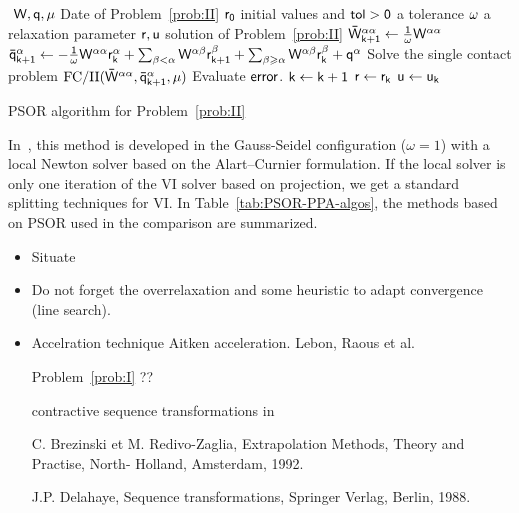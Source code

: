\begin{algorithm}
  \begin{algorithmic}
    {\sf
      \STATE $ $ 
      \REQUIRE $\sf W,q,\mu $ Date of Problem~\ref{prob:II} 
      \REQUIRE $\sf r_0$ initial values and $\sf tol >0$ a tolerance
      \REQUIRE $\sf \omega$ a relaxation parameter 
      \ENSURE  $\sf r,u$ solution of Problem~\ref{prob:II}
      \STATE $\sf \bar W^{\alpha\alpha}_{k+1} \leftarrow  \frac 1 \omega W^{\alpha\alpha}$
      \STATE $\sf   \bar q^{\alpha}_{k+1} \leftarrow - \frac 1 \omega W^{\alpha\alpha} r^{\alpha}_{k}
      + \sum_{\beta < \alpha}W^{\alpha\beta} r^{\beta}_{k+1} + \sum_{\beta
        \geq \alpha}W^{\alpha\beta} r^{\beta}_{k} + q^\alpha $
      \STATE Solve the single contact problem $\sf \mathrm{FC/II}(\bar W^{\alpha\alpha},\bar q^{\alpha}_{k+1},\mu)$
      \ENDFOR
      \STATE Evaluate $\sf error$.
      \STATE $\sf k \leftarrow k+1$ 
      \ENDWHILE
      \STATE $\sf r \leftarrow r_{k}$ 
      \STATE $\sf u \leftarrow u_{k}$ 
    }
  \end{algorithmic}
  \caption{PSOR algorithm for Problem~\ref{prob:II}}  \label{Algo:PSOR-II}
\end{algorithm}

In~\cite{Jourdan.Alart.ea98}, this method is developed in the Gauss-Seidel configuration ($\omega=1$) with a local Newton solver based on the Alart--Curnier formulation. If the local solver is only one iteration of the VI solver based on projection, we get a standard splitting techniques for VI. In Table~\ref{tab:PSOR-PPA-algos}, the methods based on PSOR used in the comparison are summarized.

\begin{ndrva}
  \begin{itemize}
  \item Situate \cite{Hayashi.ea_JCAM2005}
  \item Do not forget the overrelaxation and some heuristic to adapt convergence (line search).
  \item Accelration technique
    Aitken acceleration. Lebon, Raous et al.
    
    Problem~\ref{prob:I} ??
    
    contractive sequence transformations in 
    
    C. Brezinski et M. Redivo-Zaglia, Extrapolation Methods, Theory and Practise, North- Holland, Amsterdam, 1992.
    
    J.P. Delahaye, Sequence transformations, Springer Verlag, Berlin, 1988.
  \end{itemize}
\end{ndrva}





